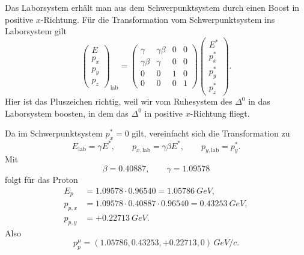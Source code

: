 \documentclass[11pt,a4paper]{scrartcl}
\begin{document}
\begin{enumerate}[label=(\alph*)]
            \begin{calculationbox}
                Das Laborsystem erhält man aus dem Schwerpunktsystem durch einen Boost in positive
                $x$-Richtung. Für die Transformation vom Schwerpunktsystem ins Laborsystem gilt
                \[
                    \begin{pmatrix}
                        E\\ p_x\\ p_y\\ p_z
                    \end{pmatrix}_{\mathrm{lab}}
                    =
                    \begin{pmatrix}
                        \gamma & \gamma\beta & 0 & 0\\
                        \gamma\beta & \gamma & 0 & 0\\
                        0 & 0 & 1 & 0\\
                        0 & 0 & 0 & 1
                    \end{pmatrix}
                    \begin{pmatrix}
                        E^*\\ p_x^*\\ p_y^*\\ p_z^*
                    \end{pmatrix}.
                \]
                Hier ist das Pluszeichen richtig, weil wir vom Ruhesystem des $\Delta^0$ in das
                Laborsystem boosten, in dem das $\Delta^0$ in positive $x$-Richtung fliegt.

                \begin{calculationbox}
                    Da im Schwerpunktsystem $p_x^*=0$ gilt, vereinfacht sich die Transformation zu
                    \[
                        E_{\mathrm{lab}}=\gamma E^*,
                        \qquad
                        p_{x,\mathrm{lab}}=\gamma\beta E^*,
                        \qquad
                        p_{y,\mathrm{lab}}=p_y^*.
                    \]
                    Mit
                    \[
                        \beta=0.40887,
                        \qquad
                        \gamma=1.09578
                    \]
                    folgt für das Proton
                    \begin{align*}
                        E_p&=1.09578\cdot0.96540=\SI{1.05786}{GeV},\\
                        p_{p,x}&=1.09578\cdot0.40887\cdot0.96540=\SI{0.43253}{GeV},\\
                        p_{p,y}&=+\SI{0.22713}{GeV}.
                    \end{align*}
                    Also
                    \[
                        p_p^{\mu}=(1.05786,0.43253,+0.22713,0)\,\si{GeV/c}.
                    \]
                \end{calculationbox}


\end{calculationbox}
\end{enumerate}
\end{document}

